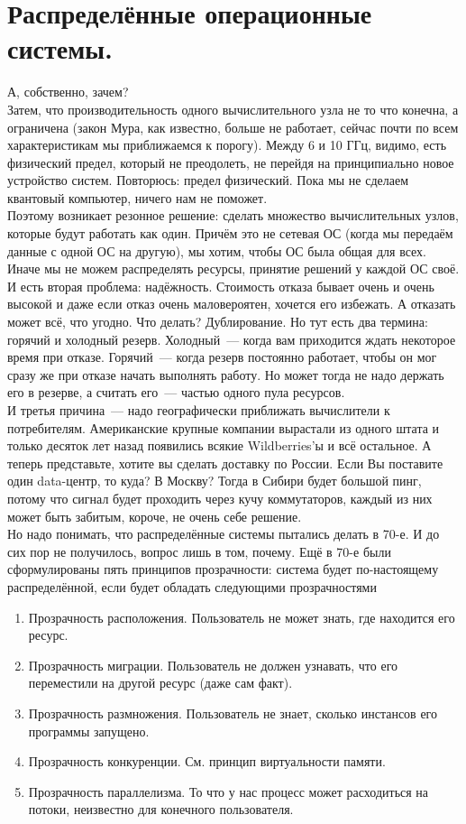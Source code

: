 \documentclass{article}
\begin{document}
    \section{Распределённые операционные системы.}
    А, собственно, зачем?\\
    Затем, что производительность одного вычислительного узла не то что конечна, а ограничена (закон Мура, как известно, больше не работает, сейчас почти по всем характеристикам мы приближаемся к порогу). Между 6 и 10 ГГц, видимо, есть физический предел, который не преодолеть, не перейдя на принципиально новое устройство систем. Повторюсь: предел физический. Пока мы не сделаем квантовый компьютер, ничего нам не поможет.\\
    Поэтому возникает резонное решение: сделать множество вычислительных узлов, которые будут работать как один. Причём это не сетевая ОС (когда мы передаём данные с одной ОС на другую), мы хотим, чтобы ОС была общая для всех. Иначе мы не можем распределять ресурсы, принятие решений у каждой ОС своё.\\
    И есть вторая проблема: надёжность. Стоимость отказа бывает очень и очень высокой и даже если отказ очень маловероятен, хочется его избежать. А отказать может всё, что угодно. Что делать? Дублирование. Но тут есть два термина: горячий и холодный резерв. Холодный~--- когда вам приходится ждать некоторое время при отказе. Горячий~--- когда резерв постоянно работает, чтобы он мог сразу же при отказе начать выполнять работу. Но может тогда не надо держать его в резерве, а считать его~--- частью одного пула ресурсов.\\
    И третья причина~--- надо географически приближать вычислители к потребителям. Американские крупные компании вырастали из одного штата и только десяток лет назад появились всякие Wildberries'ы и всё остальное. А теперь представьте, хотите вы сделать доставку по России. Если Вы поставите один data-центр, то куда? В Москву? Тогда в Сибири будет большой пинг, потому что сигнал будет проходить через кучу коммутаторов, каждый из них может быть забитым, короче, не очень себе решение.\\
    Но надо понимать, что распределённые системы пытались делать в 70-е. И до сих пор не получилось, вопрос лишь в том, почему. Ещё в 70-е были сформулированы пять принципов прозрачности: система будет по-настоящему распределённой, если будет обладать следующими прозрачностями
    \begin{enumerate}
        \item Прозрачность расположения. Пользователь не может знать, где находится его ресурс.
        \item Прозрачность миграции. Пользователь не должен узнавать, что его переместили на другой ресурс (даже сам факт).
        \item Прозрачность размножения. Пользователь не знает, сколько инстансов его программы запущено.
        \item Прозрачность конкуренции. См. принцип виртуальности памяти.
        \item Прозрачность параллелизма. То что у нас процесс может расходиться на потоки, неизвестно для конечного пользователя.
    \end{enumerate}
\end{document}
